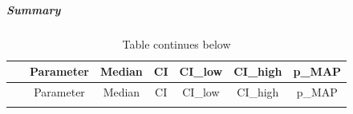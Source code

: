 \documentclass[
]{article}
\begin{document}
\hypertarget{summary-1}{%
\subparagraph{Summary}\label{summary-1}}

\begin{longtable}[]{@{}ccccccc@{}}
\caption{Table continues below}\tabularnewline
\toprule
\begin{minipage}[b]{0.09\columnwidth}\centering
~\strut
\end{minipage} & \begin{minipage}[b]{0.24\columnwidth}\centering
Parameter\strut
\end{minipage} & \begin{minipage}[b]{0.09\columnwidth}\centering
Median\strut
\end{minipage} & \begin{minipage}[b]{0.05\columnwidth}\centering
CI\strut
\end{minipage} & \begin{minipage}[b]{0.10\columnwidth}\centering
CI\_low\strut
\end{minipage} & \begin{minipage}[b]{0.10\columnwidth}\centering
CI\_high\strut
\end{minipage} & \begin{minipage}[b]{0.12\columnwidth}\centering
p\_MAP\strut
\end{minipage}\tabularnewline
\midrule
\endfirsthead
\toprule
\begin{minipage}[b]{0.09\columnwidth}\centering
~\strut
\end{minipage} & \begin{minipage}[b]{0.24\columnwidth}\centering
Parameter\strut
\end{minipage} & \begin{minipage}[b]{0.09\columnwidth}\centering
Median\strut
\end{minipage} & \begin{minipage}[b]{0.05\columnwidth}\centering
CI\strut
\end{minipage} & \begin{minipage}[b]{0.10\columnwidth}\centering
CI\_low\strut
\end{minipage} & \begin{minipage}[b]{0.10\columnwidth}\centering
CI\_high\strut
\end{minipage} & \begin{minipage}[b]{0.12\columnwidth}\centering
p\_MAP\strut
\end{minipage}\tabularnewline
\midrule
\endhead
\begin{minipage}[t]{0.09\columnwidth}\centering

\end{minipage}
\end{longtable}
\end{document}
